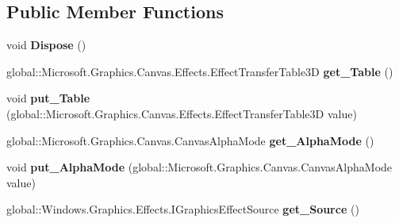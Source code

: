 \subsection*{Public Member Functions}
\begin{DoxyCompactItemize}
\item 
\mbox{\label{class_microsoft_1_1_graphics_1_1_canvas_1_1_effects_1_1_table_transfer3_d_effect_a8fea9844c0b93747df6430c49d676897}} 
void {\bfseries Dispose} ()
\item 
\mbox{\label{class_microsoft_1_1_graphics_1_1_canvas_1_1_effects_1_1_table_transfer3_d_effect_a8479c991b8673215ffa620b727b809f2}} 
global\+::\+Microsoft.\+Graphics.\+Canvas.\+Effects.\+Effect\+Transfer\+Table3D {\bfseries get\+\_\+\+Table} ()
\item 
\mbox{\label{class_microsoft_1_1_graphics_1_1_canvas_1_1_effects_1_1_table_transfer3_d_effect_aa43aa9c3e770ae4bd2b2ea28e4c714d2}} 
void {\bfseries put\+\_\+\+Table} (global\+::\+Microsoft.\+Graphics.\+Canvas.\+Effects.\+Effect\+Transfer\+Table3D value)
\item 
\mbox{\label{class_microsoft_1_1_graphics_1_1_canvas_1_1_effects_1_1_table_transfer3_d_effect_ae5fb4228975aa7d022d2195c1982b82d}} 
global\+::\+Microsoft.\+Graphics.\+Canvas.\+Canvas\+Alpha\+Mode {\bfseries get\+\_\+\+Alpha\+Mode} ()
\item 
\mbox{\label{class_microsoft_1_1_graphics_1_1_canvas_1_1_effects_1_1_table_transfer3_d_effect_a72566b9b3a7e95c18cd980ff24a9d5d8}} 
void {\bfseries put\+\_\+\+Alpha\+Mode} (global\+::\+Microsoft.\+Graphics.\+Canvas.\+Canvas\+Alpha\+Mode value)
\item 
\mbox{\label{class_microsoft_1_1_graphics_1_1_canvas_1_1_effects_1_1_table_transfer3_d_effect_a2f23f417bf05d4c1d8141d26fd77d028}} 
global\+::\+Windows.\+Graphics.\+Effects.\+I\+Graphics\+Effect\+Source {\bfseries get\+\_\+\+Source} ()

\end{DoxyCompactItemize}
